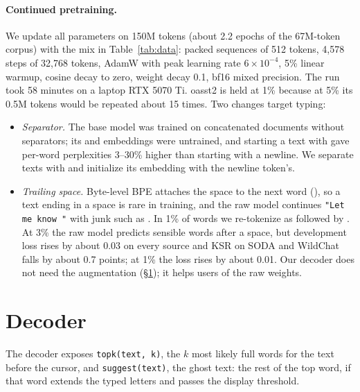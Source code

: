 \documentclass[11pt]{article}
\newcommand{\tok}[1]{\texttt{\detokenize{#1}}}
\begin{document}
\paragraph{Continued pretraining.} We update all parameters on 150M tokens (about 2.2 epochs of the 67M-token
corpus) with the mix in Table~\ref{tab:data}: packed sequences of 512 tokens, 4,578 steps of 32,768 tokens, AdamW
\citep{loshchilov-hutter-2019-decoupled} with peak learning rate $6\times10^{-4}$, 5\% linear warmup, cosine decay to
zero, weight decay 0.1, bf16 mixed precision. The run took 58 minutes on a laptop RTX 5070 Ti. oasst2 is held at
1\% because at 5\% its 0.5M tokens would be repeated about 15 times. Two changes target typing:
\begin{itemize}
  \item \emph{Separator.} The base model was trained on concatenated documents without separators; its \tok{<s>} and
  \tok{</s>} embeddings were untrained, and starting a text with \tok{<s>} gave per-word perplexities 3--30\% higher
  than starting with a newline. We separate texts with \tok{</s>} and initialize its embedding with the newline
  token's.
  \item \emph{Trailing space.} Byte-level BPE attaches the space to the next word (\tok{" know"}), so a text ending
  in a space is rare in training, and the raw model continues \texttt{"Let me know "} with junk such as \tok{"!"}.
  In 1\% of words we re-tokenize \tok{" word"} as \tok{" "} followed by \tok{"word"}. At 3\% the raw model predicts
  sensible words after a space, but development loss rises by about 0.03 on every source and KSR on SODA and
  WildChat falls by about 0.7 points; at 1\% the loss rises by about 0.01. Our decoder does not need the augmentation
  (\S\ref{sec:decoder}); it helps users of the raw weights.
\end{itemize}

\section{Decoder}
\label{sec:decoder}

The decoder exposes \texttt{topk(text, k)}, the $k$ most likely full words for the text before the cursor, and
\texttt{suggest(text)}, the ghost text: the rest of the top word, if that word extends the typed letters and passes
the display threshold.
\end{document}

